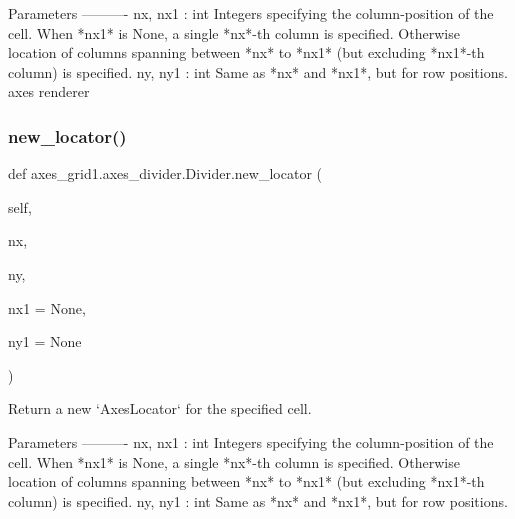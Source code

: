 \begin{DoxyVerb}Parameters
----------
nx, nx1 : int
    Integers specifying the column-position of the
    cell. When *nx1* is None, a single *nx*-th column is
    specified. Otherwise location of columns spanning between *nx*
    to *nx1* (but excluding *nx1*-th column) is specified.
ny, ny1 : int
    Same as *nx* and *nx1*, but for row positions.
axes
renderer
\end{DoxyVerb}
 \mbox{\label{classaxes__grid1_1_1axes__divider_1_1Divider_a1c119785520c4cd9109236ee86ace06e}} 
\subsubsection{\texorpdfstring{new\+\_\+locator()}{new\_locator()}}
{\footnotesize\ttfamily def axes\+\_\+grid1.\+axes\+\_\+divider.\+Divider.\+new\+\_\+locator (\begin{DoxyParamCaption}\item[{}]{self,  }\item[{}]{nx,  }\item[{}]{ny,  }\item[{}]{nx1 = {\ttfamily None},  }\item[{}]{ny1 = {\ttfamily None} }\end{DoxyParamCaption})}

\begin{DoxyVerb}Return a new `AxesLocator` for the specified cell.

Parameters
----------
nx, nx1 : int
    Integers specifying the column-position of the
    cell. When *nx1* is None, a single *nx*-th column is
    specified. Otherwise location of columns spanning between *nx*
    to *nx1* (but excluding *nx1*-th column) is specified.
ny, ny1 : int
    Same as *nx* and *nx1*, but for row positions.
\end{DoxyVerb}
 \mbox{\label{classaxes__grid1_1_1axes__divider_1_1Divider_afe00e87b9a083c9d6bb5bb2ac69d95d2}} 
